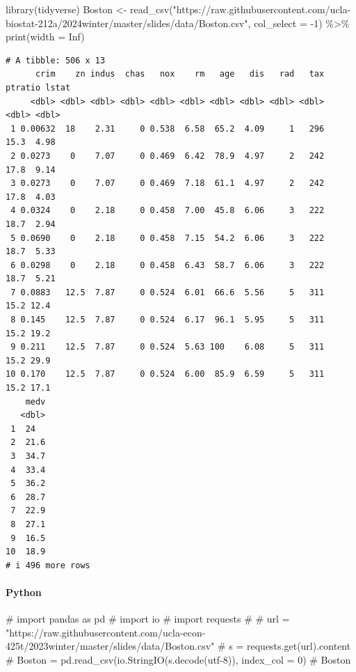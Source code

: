 \documentclass[
]{article}
\let\oldparagraph\paragraph
\renewcommand{\paragraph}[1]{\oldparagraph{#1}\mbox{}}
\newenvironment{Shaded}{\begin{snugshade}}{\end{snugshade}}
\newcommand{\AttributeTok}[1]{\textcolor[rgb]{0.40,0.45,0.13}{#1}}
\newcommand{\CommentTok}[1]{\textcolor[rgb]{0.37,0.37,0.37}{#1}}
\newcommand{\ConstantTok}[1]{\textcolor[rgb]{0.56,0.35,0.01}{#1}}
\newcommand{\DecValTok}[1]{\textcolor[rgb]{0.68,0.00,0.00}{#1}}
\newcommand{\FunctionTok}[1]{\textcolor[rgb]{0.28,0.35,0.67}{#1}}
\newcommand{\NormalTok}[1]{\textcolor[rgb]{0.00,0.23,0.31}{#1}}
\newcommand{\OtherTok}[1]{\textcolor[rgb]{0.00,0.23,0.31}{#1}}
\newcommand{\SpecialCharTok}[1]{\textcolor[rgb]{0.37,0.37,0.37}{#1}}
\newcommand{\StringTok}[1]{\textcolor[rgb]{0.13,0.47,0.30}{#1}}
\begin{document}
\begin{Shaded}
\begin{Highlighting}[]
\FunctionTok{library}\NormalTok{(tidyverse)}
\NormalTok{Boston }\OtherTok{\textless{}{-}} \FunctionTok{read\_csv}\NormalTok{(}\StringTok{"https://raw.githubusercontent.com/ucla{-}biostat{-}212a/2024winter/master/slides/data/Boston.csv"}\NormalTok{, }\AttributeTok{col\_select =} \SpecialCharTok{{-}}\DecValTok{1}\NormalTok{) }\SpecialCharTok{\%\textgreater{}\%} 
  \FunctionTok{print}\NormalTok{(}\AttributeTok{width =} \ConstantTok{Inf}\NormalTok{)}
\end{Highlighting}
\end{Shaded}

\begin{verbatim}
# A tibble: 506 x 13
      crim    zn indus  chas   nox    rm   age   dis   rad   tax ptratio lstat
     <dbl> <dbl> <dbl> <dbl> <dbl> <dbl> <dbl> <dbl> <dbl> <dbl>   <dbl> <dbl>
 1 0.00632  18    2.31     0 0.538  6.58  65.2  4.09     1   296    15.3  4.98
 2 0.0273    0    7.07     0 0.469  6.42  78.9  4.97     2   242    17.8  9.14
 3 0.0273    0    7.07     0 0.469  7.18  61.1  4.97     2   242    17.8  4.03
 4 0.0324    0    2.18     0 0.458  7.00  45.8  6.06     3   222    18.7  2.94
 5 0.0690    0    2.18     0 0.458  7.15  54.2  6.06     3   222    18.7  5.33
 6 0.0298    0    2.18     0 0.458  6.43  58.7  6.06     3   222    18.7  5.21
 7 0.0883   12.5  7.87     0 0.524  6.01  66.6  5.56     5   311    15.2 12.4 
 8 0.145    12.5  7.87     0 0.524  6.17  96.1  5.95     5   311    15.2 19.2 
 9 0.211    12.5  7.87     0 0.524  5.63 100    6.08     5   311    15.2 29.9 
10 0.170    12.5  7.87     0 0.524  6.00  85.9  6.59     5   311    15.2 17.1 
    medv
   <dbl>
 1  24  
 2  21.6
 3  34.7
 4  33.4
 5  36.2
 6  28.7
 7  22.9
 8  27.1
 9  16.5
10  18.9
# i 496 more rows
\end{verbatim}

\paragraph{Python}

\begin{Shaded}
\begin{Highlighting}[]
\CommentTok{\# import pandas as pd}
\CommentTok{\# import io}
\CommentTok{\# import requests}
\CommentTok{\# }
\CommentTok{\# url = "https://raw.githubusercontent.com/ucla{-}econ{-}425t/2023winter/master/slides/data/Boston.csv"}
\CommentTok{\# s = requests.get(url).content}
\CommentTok{\# Boston = pd.read\_csv(io.StringIO(s.decode(\textquotesingle{}utf{-}8\textquotesingle{})), index\_col = 0)}
\CommentTok{\# Boston}
\end{Highlighting}
\end{Shaded}
\end{document}
